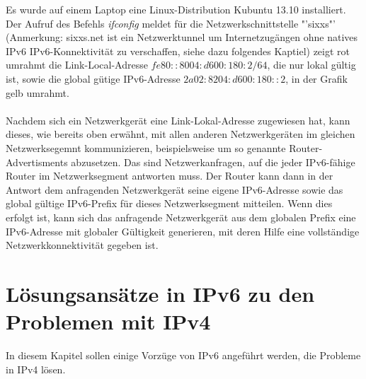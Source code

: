 \documentclass[a4paper,12pt]{scrartcl}
\begin{document}
Es wurde auf einem Laptop eine Linux-Distribution Kubuntu 13.10 installiert. Der Aufruf des Befehls \textit{ifconfig} meldet f\"ur die Netzwerkschnittstelle "'sixxs"' (Anmerkung: sixxs.net ist ein Netzwerktunnel um Internetzug\"angen ohne natives IPv6 IPv6-Konnektivit\"at zu verschaffen, siehe dazu folgendes Kaptiel) zeigt rot umrahmt die Link-Local-Adresse $fe80::8004:d600:180:2/64$, die nur lokal g\"ultig ist, sowie die global g\"utige IPv6-Adresse $2a02:8204:d600:180::2$, in der Grafik gelb umrahmt.\\
\\
Nachdem sich ein Netzwerkger\"at eine Link-Lokal-Adresse zugewiesen hat, kann dieses, wie bereits oben erw\"ahnt, mit allen anderen Netzwerkger\"aten im gleichen Netzwerksegemnt kommunizieren, beispielsweise um so genannte Router-Advertisments abzusetzen. Das sind Netzwerkanfragen, auf die jeder IPv6-f\"ahige Router im Netzwerksegment antworten muss. Der Router kann dann in der Antwort dem anfragenden Netzwerkger\"at seine eigene IPv6-Adresse sowie das global g\"ultige IPv6-Prefix f\"ur dieses Netzwerksegment mitteilen. Wenn dies erfolgt ist, kann sich das anfragende Netzwerkger\"at aus dem globalen Prefix eine IPv6-Adresse mit globaler G\"ultigkeit generieren, mit deren Hilfe eine vollst\"andige Netzwerkkonnektivit\"at gegeben ist. 


\clearpage
\section{L\"osungsans\"atze in IPv6 zu den Problemen mit IPv4}
In diesem Kapitel sollen einige Vorz\"uge von IPv6 angef\"uhrt werden, die Probleme in IPv4 l\"osen.
 
\end{document}

